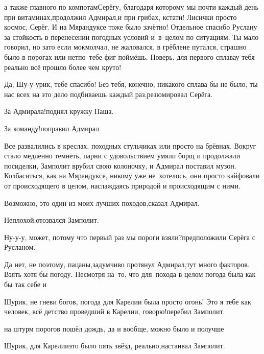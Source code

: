 \diagdash \myldots{}а также главного по компотам\mdash Серёгу, благодаря которому мы почти каждый день при витаминах,\mdash продолжил Адмирал,\mdash и при грибах, кстати! Лисички просто космос, Серёг. И на Мярандуксе тоже было зачётно! Отдельное спасибо Руслану за стойкость в перенесении погодных условий и~в~целом по ситуациям. Ты мало говорил, но зато если мок\mdash молчал, не жаловался, в грёбле\mdash не путался, страшно было в порогах или нет\mdash по~тебе фиг поймёшь. Поверь, для первого сплава\mdash у тебя реально всё прошло более чем круто! 

\diagdash Да, Шу-у-урик, тебе спасибо! Без тебя, конечно, никакого сплава бы не было, ты нас всех на это дело подбиваешь каждый раз,\mdash резюмировал Серёга.

\diagdash За Адмирала!\mdash поднял кружку Паша.

%

\diagdash За команду!\mdash поправил Адмирал\myldots{}

\myldots{}Все развалились в креслах, походных стульчиках или просто на брёвнах. Вокруг стало медленно темнеть, парни с удовольствием умяли борщ и продолжали посиделки, Замполит врубил свою колоночку, и Адмирал поставил музон. Колбаситься, как на Мярандуксе, никому уже не~хотелось, они просто кайфовали от происходящего в целом, наслаждаясь природой и происходящим с ними.

\diagdash Возможно, это один из моих лучших походов,\mdash сказал Адмирал.

\diagdash Неплохой,\mdash отозвался Замполит.

\diagdash Ну-у-у, может, потому что первый раз мы пороги взяли?\mdash предположили Серёга с Русланом.

\diagdash Да нет, не поэтому, пацаны,\mdash задумчиво протянул Адмирал,\mdash тут много факторов. Взять хотя бы погоду. Несмотря на~то, что для~похода в целом погода была как бы так себе и\myldots{}

\diagdash Шурик, не гневи богов, погода для Карелии была просто огонь! Это я тебе как человек, всё детство проведший в Карелии, говорю!\mdash перебил Замполит.

\diagdash \myldots{}на штурм порогов пошёл дождь, да и вообще, можно было и получше\myldots{}

\diagdash Шурик, для Карелии\mdash это было пять звёзд, реально,\mdash настаивал Замполит.

